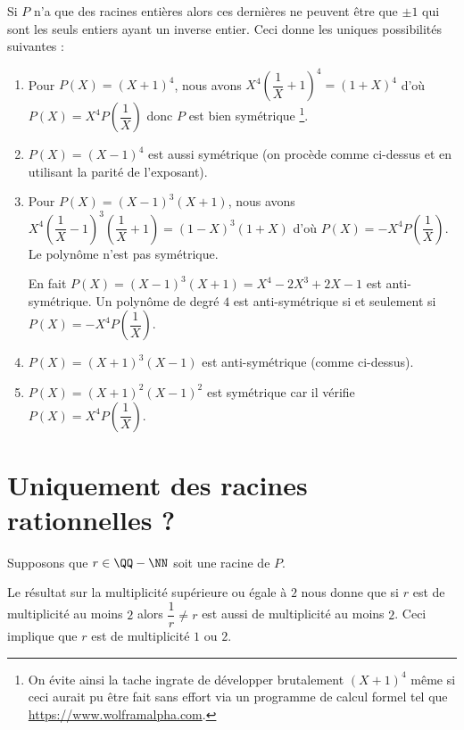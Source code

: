 \documentclass[12pt]{amsart}
\begin{document}
Si $P$ n'a que des racines entières alors ces dernières ne peuvent être que $\pm 1$ qui sont les seuls entiers ayant un inverse entier. Ceci donne les uniques  possibilités suivantes :

\begin{enumerate}
	\item Pour $P(X) = (X + 1)^4$, nous avons
	      $X^4 \left( \dfrac1X + 1\right)^4 = (1 + X)^4$ 
	      d'où
	      $P(X) = X^4 P\left( \dfrac1X \right)$
	      donc $P$ est bien symétrique
	      \footnote{
	      	On évite ainsi la tache ingrate de développer brutalement $(X + 1)^4$ même si ceci aurait pu être fait sans effort via un programme de calcul formel tel que \url{https://www.wolframalpha.com}.
		  }.

	\item $P(X) = (X - 1)^4$ est aussi symétrique (on procède comme ci-dessus et en utilisant la parité de l'exposant).
	
	\item Pour $P(X) = (X - 1)^3 (X + 1)$, nous avons
	      $X^4 \left( \dfrac1X - 1\right)^3 \left( \dfrac1X + 1\right)
	      = (1 - X)^3 (1 + X)$
	      d'où
	      $P(X) = - X^4 P\left( \dfrac1X \right)$.
	      Le polynôme n'est pas symétrique.

	      \noindent En fait $P(X) = (X - 1)^3 (X + 1) = X^4 - 2 X^3 + 2 X - 1$ est anti-symétrique. 
	      Un polynôme de degré $4$ est anti-symétrique si et seulement si  $P(X) = - X^4 P\left( \dfrac1X \right)$.
	
	\item $P(X) = (X + 1)^3 (X - 1)$ est anti-symétrique (comme ci-dessus).

	\item $P(X) = (X + 1)^2 (X - 1)^2$ est symétrique car il vérifie $P(X) = X^4 P\left( \dfrac1X \right)$.
\end{enumerate}


\section{Uniquement des racines rationnelles ?}

Supposons que $r \in \QQ - \NN$ soit une racine de $P$.

\medskip

Le résultat sur la multiplicité supérieure ou égale à $2$ nous donne que si $r$ est de multiplicité au moins $2$ alors $\dfrac1r \neq r$ est aussi de multiplicité au moins $2$.
Ceci implique que $r$ est de multiplicité $1$ ou $2$.
\end{document}
